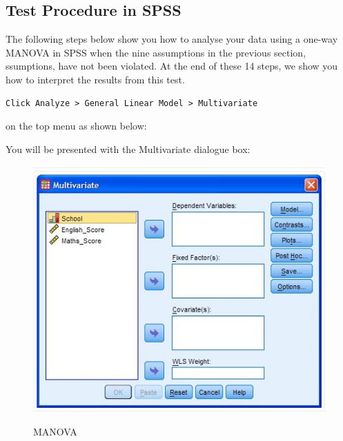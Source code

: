 \documentclass[a4paper,12pt]{article}
\begin{document}
\subsection{Test Procedure in SPSS}
The following steps below show you how to analyse your data using a one-way MANOVA in SPSS when the nine assumptions in the previous section, ssumptions, have not been violated. At the end of these 14 steps, we show you how to interpret the results from this test.
\begin{verbatim}
Click Analyze > General Linear Model > Multivariate
\end{verbatim}
on the top menu as shown below:



You will be presented with the Multivariate dialogue box:

\begin{center}
\begin{figure}[h!]
  \includegraphics[scale=0.4]{images/MANOVA1}\\
  \caption{MANOVA}
\end{figure}
\end{center}
\end{document}

